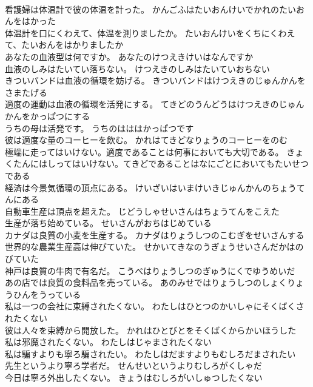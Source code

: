 \documentclass[8pt]{extreport}
\begin{document}
\begin{CJK}{UTF8}{min}
\\	看護婦は体温計で彼の体温を計った。	かんごふはたいおんけいでかれのたいおんをはかった 
\\	体温計を口にくわえて、体温を測りましたか。	たいおんけいをくちにくわえて、たいおんをはかりましたか 
\\	あなたの血液型は何ですか。	あなたのけつえきけいはなんですか 
\\	血液のしみはたいてい落ちない。	けつえきのしみはたいていおちない 
\\	きついバンドは血液の循環を妨げる。	きついバンドはけつえきのじゅんかんをさまたげる 
\\	適度の運動は血液の循環を活発にする。	てきどのうんどうはけつえきのじゅんかんをかっぱつにする 
\\	うちの母は活発です。	うちのはははかっぱつです 
\\	彼は適度な量のコーヒーを飲む。	かれはてきどなりょうのコーヒーをのむ 
\\	極端に走ってはいけない。適度であることは何事においても大切である。	きょくたんにはしってはいけない。てきどであることはなにごとにおいてもたいせつである 
\\	経済は今景気循環の頂点にある。	けいざいはいまけいきじゅんかんのちょうてんにある 
\\	自動車生産は頂点を超えた。	じどうしゃせいさんはちょうてんをこえた 
\\	生産が落ち始めている。	せいさんがおちはじめている 
\\	カナダは良質の小麦を生産する。	カナダはりょうしつのこむぎをせいさんする 
\\	世界的な農業生産高は伸びていた。	せかいてきなのうぎょうせいさんだかはのびていた 
\\	神戸は良質の牛肉で有名だ。	こうべはりょうしつのぎゅうにくでゆうめいだ 
\\	あの店では良質の食料品を売っている。	あのみせではりょうしつのしょくりょうひんをうっている 
\\	私は一つの会社に束縛されたくない。	わたしはひとつのかいしゃにそくばくされたくない 
\\	彼は人々を束縛から開放した。	かれはひとびとをそくばくからかいほうした 
\\	私は邪魔されたくない。	わたしはじゃまされたくない 
\\	私は騙すよりも寧ろ騙されたい。	わたしはだますよりもむしろだまされたい 
\\	先生というより寧ろ学者だ。	せんせいというよりむしろがくしゃだ 
\\	今日は寧ろ外出したくない。	きょうはむしろがいしゅつしたくない 

\end{CJK}
\end{document}

